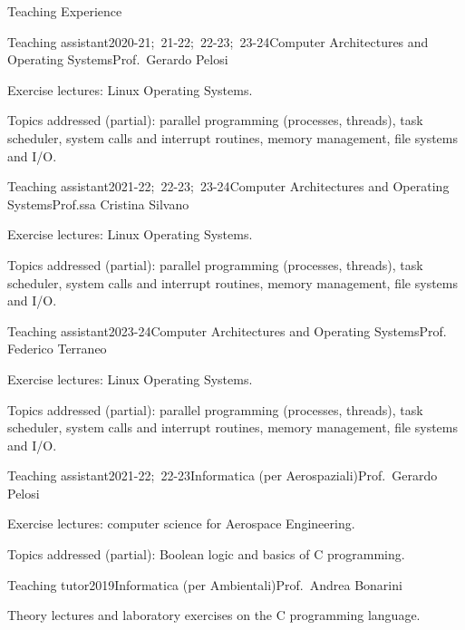\documentclass[
	a4paper, %
	11pt, %
]{resume} %
\begin{document}
\begin{rSection}{Teaching Experience}

  \begin{rSubsection}{Teaching assistant}{2020-21;\ 21-22;\ 22-23;\ 23-24}{Computer Architectures and Operating Systems}{Prof.\ Gerardo Pelosi}
  \item Exercise lectures: Linux Operating Systems.
  \item Topics addressed (partial): parallel programming (processes, threads),
    task scheduler, system calls and interrupt routines, memory management, file
    systems and I/O.
  \end{rSubsection}
  \begin{rSubsection}{Teaching assistant}{2021-22;\ 22-23;\ 23-24}{Computer Architectures and
      Operating Systems}{Prof.ssa Cristina Silvano }
  \item Exercise lectures: Linux Operating Systems.
  \item Topics addressed (partial): parallel programming (processes, threads),
    task scheduler, system calls and interrupt routines, memory management, file
    systems and I/O.
  \end{rSubsection}
  \begin{rSubsection}{Teaching assistant}{2023-24}{Computer Architectures and
      Operating Systems}{Prof. Federico Terraneo }
  \item Exercise lectures: Linux Operating Systems.
  \item Topics addressed (partial): parallel programming (processes, threads),
    task scheduler, system calls and interrupt routines, memory management, file
    systems and I/O.
  \end{rSubsection}
  \begin{rSubsection}{Teaching assistant}{2021-22;\ 22-23}{Informatica (per Aerospaziali)}{Prof.\ Gerardo Pelosi}
  \item Exercise lectures: computer science for Aerospace Engineering.
  \item Topics addressed (partial): Boolean logic and basics of C programming.
  \end{rSubsection}
\begin{rSubsection}{Teaching tutor}{2019}{Informatica (per Ambientali)}{Prof.\ Andrea Bonarini}
\item Theory lectures and laboratory exercises on the C programming language.

\end{rSubsection}
\end{rSection}
\end{document}
